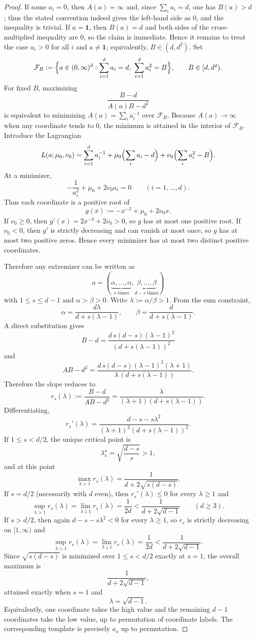 \documentclass[11pt]{amsart}
\theoremstyle{definition}
\newcommand{\one}{\mathbf 1}
\newcommand{\cF}{\mathcal F}
\begin{document}
\begin{proof}
If some $a_i=0$, then $A(a)=\infty$ and, since $\sum_i a_i=d$, one has $B(a)>d$; thus the stated convention indeed gives the left-hand side as $0$, and the inequality is trivial.
If $a=\one$, then $B(a)=d$ and both sides of the cross-multiplied inequality are $0$, so the claim is immediate.
Hence it remains to treat the case $a_i>0$ for all $i$ and $a\neq\one$; equivalently, $B\in(d,d^2)$.
Set
\[
\cF_B:=\Bigl\{a\in(0,\infty)^d:\sum_{i=1}^d a_i=d,\ \sum_{i=1}^d a_i^2=B\Bigr\},
\qquad B\in[d,d^2).
\]
For fixed $B$, maximizing
\[
\frac{B-d}{A(a)B-d^2}
\]
is equivalent to minimizing $A(a)=\sum_i a_i^{-1}$ over $\cF_B$.
Because $A(a)\to \infty$ when any coordinate tends to $0$, the minimum is attained in the interior of $\cF_B$. Introduce the Lagrangian
\[
L(a;\mu_0,\nu_0)=\sum_{i=1}^d a_i^{-1}+\mu_0\Bigl(\sum_i a_i-d\Bigr)+\nu_0\Bigl(\sum_i a_i^2-B\Bigr).
\]
At a minimizer,
\[
-\frac{1}{a_i^2}+\mu_0+2\nu_0 a_i=0
\qquad (i=1,\dots,d).
\]
Thus each coordinate is a positive root of
\[
g(x):=-x^{-2}+\mu_0+2\nu_0 x.
\]
If $\nu_0\ge 0$, then $g'(x)=2x^{-3}+2\nu_0>0$, so $g$ has at most one positive root. If $\nu_0<0$, then $g'$ is strictly decreasing and can vanish at most once, so $g$ has at most two positive zeros. Hence every minimizer has at most two distinct positive coordinates.

Therefore any extremizer can be written as
\[
a=(\underbrace{\alpha,\dots,\alpha}_{s\text{ times}},\underbrace{\beta,\dots,\beta}_{d-s\text{ times}})
\]
with $1\le s\le d-1$ and $\alpha>\beta>0$. Write $\lambda:=\alpha/\beta>1$. From the sum constraint,
\[
\alpha=\frac{d\lambda}{d+s(\lambda-1)},
\qquad
\beta=\frac{d}{d+s(\lambda-1)}.
\]
A direct substitution gives
\[
B-d=\frac{d\,s(d-s)(\lambda-1)^2}{(d+s(\lambda-1))^2}
\]
and
\[
AB-d^2=\frac{d\,s(d-s)(\lambda-1)^2(\lambda+1)}{\lambda\,(d+s(\lambda-1))}.
\]
Therefore the slope reduces to
\[
r_s(\lambda):=\frac{B-d}{AB-d^2}=\frac{\lambda}{(\lambda+1)(d+s(\lambda-1))}.
\]
Differentiating,
\[
r_s'(\lambda)=\frac{d-s-s\lambda^2}{(\lambda+1)^2(d+s(\lambda-1))^2}.
\]
If $1\le s<d/2$, the unique critical point is
\[
\lambda_s^\star=\sqrt{\frac{d-s}{s}}>1,
\]
and at this point
\[
\max_{\lambda>1} r_s(\lambda)=\frac{1}{d+2\sqrt{s(d-s)}}.
\]
If $s=d/2$ (necessarily with $d$ even), then $r_s'(\lambda)\le 0$ for every $\lambda\ge 1$ and
\[
\sup_{\lambda>1} r_s(\lambda)=\lim_{\lambda\downarrow 1} r_s(\lambda)=\frac{1}{2d}
<
\frac{1}{d+2\sqrt{d-1}}
\qquad (d\ge 3).
\]
If $s>d/2$, then again $d-s-s\lambda^2<0$ for every $\lambda\ge 1$, so $r_s$ is strictly decreasing on $[1,\infty)$ and
\[
\sup_{\lambda>1} r_s(\lambda)=\lim_{\lambda\downarrow 1} r_s(\lambda)=\frac{1}{2d}
<
\frac{1}{d+2\sqrt{d-1}}.
\]
Since $\sqrt{s(d-s)}$ is minimized over $1\le s<d/2$ exactly at $s=1$, the overall maximum is
\[
\frac{1}{d+2\sqrt{d-1}},
\]
attained exactly when $s=1$ and
\[
\lambda=\sqrt{d-1}.
\]
Equivalently, one coordinate takes the high value and the remaining $d-1$ coordinates take the low value, up to permutation of coordinate labels. The corresponding template is precisely $a_\star$ up to permutation.
\end{proof}
\end{document}
